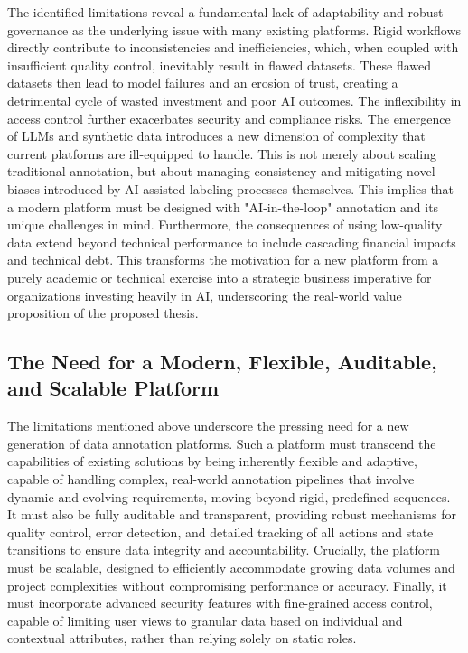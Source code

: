 The identified limitations reveal a fundamental lack of adaptability and robust governance as the underlying issue with many existing platforms. Rigid workflows directly contribute to inconsistencies and inefficiencies, which, when coupled with insufficient quality control, inevitably result in flawed datasets. These flawed datasets then lead to model failures and an erosion of trust, creating a detrimental cycle of wasted investment and poor AI outcomes. The inflexibility in access control further exacerbates security and compliance risks. The emergence of LLMs and synthetic data introduces a new dimension of complexity that current platforms are ill-equipped to handle. This is not merely about scaling traditional annotation, but about managing consistency and mitigating novel biases introduced by AI-assisted labeling processes themselves. This implies that a modern platform must be designed with "AI-in-the-loop" annotation and its unique challenges in mind. Furthermore, the consequences of using low-quality data extend beyond technical performance to include cascading financial impacts and technical debt. This transforms the motivation for a new platform from a purely academic or technical exercise into a strategic business imperative for organizations investing heavily in AI, underscoring the real-world value proposition of the proposed thesis.

\subsection{The Need for a Modern, Flexible, Auditable, and Scalable Platform}
The limitations mentioned above underscore the pressing need for a new generation of data annotation platforms. Such a platform must transcend the capabilities of existing solutions by being inherently flexible and adaptive, capable of handling complex, real-world annotation pipelines that involve dynamic and evolving requirements, moving beyond rigid, predefined sequences. It must also be fully auditable and transparent, providing robust mechanisms for quality control, error detection, and detailed tracking of all actions and state transitions to ensure data integrity and accountability. Crucially, the platform must be scalable, designed to efficiently accommodate growing data volumes and project complexities without compromising performance or accuracy. Finally, it must incorporate advanced security features with fine-grained access control, capable of limiting user views to granular data based on individual and contextual attributes, rather than relying solely on static roles.